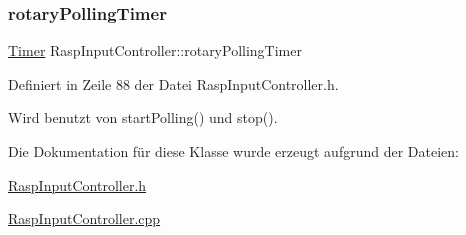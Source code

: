\mbox{\label{class_rasp_input_controller_a55b065ae154806341fd900a8b61110a5}} 
\subsubsection{\texorpdfstring{rotary\+Polling\+Timer}{rotaryPollingTimer}}
{\footnotesize\ttfamily \hyperlink{class_timer}{Timer} Rasp\+Input\+Controller\+::rotary\+Polling\+Timer\hspace{0.3cm}{\ttfamily [private]}}



Definiert in Zeile 88 der Datei Rasp\+Input\+Controller.\+h.



Wird benutzt von start\+Polling() und stop().



Die Dokumentation für diese Klasse wurde erzeugt aufgrund der Dateien\+:\begin{DoxyCompactItemize}
\item 
\hyperlink{_rasp_input_controller_8h}{Rasp\+Input\+Controller.\+h}\item 
\hyperlink{_rasp_input_controller_8cpp}{Rasp\+Input\+Controller.\+cpp}\end{DoxyCompactItemize}
